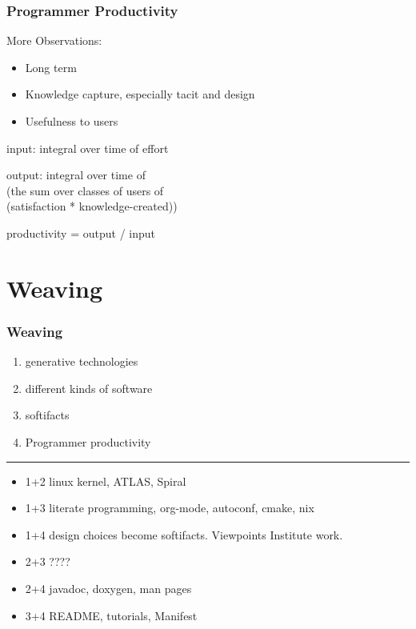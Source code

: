 \documentclass{beamer}
\begin{document}

\begin{frame}

\frametitle{Programmer Productivity}

More Observations:
\begin{itemize}
\item<1-> Long term
\item<2-> Knowledge capture, especially tacit and design
\item<3-> Usefulness to users
\end{itemize}
\vspace*{1cm}

input: integral over time of effort
\vspace*{7mm}

output: integral over time of \\
  \hspace*{2mm}(the sum over classes of users of \\
  \hspace*{3mm}(satisfaction * knowledge-created))
\vspace*{7mm}

productivity = output / input
\end{frame}


\section[Weaving]{Weaving}


\begin{frame}

\frametitle{Weaving}

\begin{enumerate}
  \item generative technologies
  \item different kinds of software
  \item softifacts
  \item Programmer productivity
\end{enumerate}
\vspace*{4mm}
\noindent\rule{\textwidth}{0.3pt}
\vspace*{2mm}
\begin{itemize}
\item 1+2 linux kernel, ATLAS, Spiral
\item 1+3 literate programming, org-mode, autoconf, cmake, nix
\item 1+4 design choices become softifacts. Viewpoints Institute work.
\item 2+3 ????
\item 2+4 javadoc, doxygen, man pages
\item 3+4 README, tutorials, Manifest
\end{itemize}

\end{frame}
\end{document}
